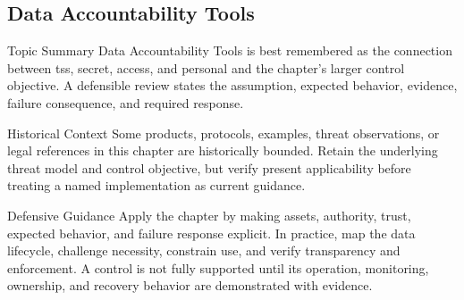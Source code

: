 \documentclass[11pt,letterpaper]{article}
\begin{document}
\subsection*{Data Accountability Tools}
\begin{CornellNotesTable}
\end{CornellNotesTable}
\begin{CornellSummaryBox}{Topic Summary}
Data Accountability Tools is best remembered as the connection between tss, secret, access, and personal and the chapter's larger control objective. A defensible review states the assumption, expected behavior, evidence, failure consequence, and required response.
\end{CornellSummaryBox}
\begin{CornellWarningBox}{Historical Context}
Some products, protocols, examples, threat observations, or legal references in this chapter are historically bounded. Retain the underlying threat model and control objective, but verify present applicability before treating a named implementation as current guidance.
\end{CornellWarningBox}
\begin{CornellOverviewBox}{Defensive Guidance}
Apply the chapter by making assets, authority, trust, expected behavior, and failure response explicit. In practice, map the data lifecycle, challenge necessity, constrain use, and verify transparency and enforcement. A control is not fully supported until its operation, monitoring, ownership, and recovery behavior are demonstrated with evidence.
\end{CornellOverviewBox}
\end{document}
